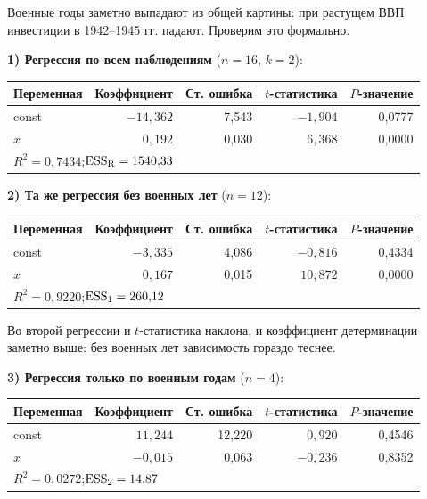 \begin{solution}
Военные годы заметно выпадают из общей картины: при растущем ВВП инвестиции в
1942--1945 гг. падают. Проверим это формально.

\medskip
\textbf{1) Регрессия по всем наблюдениям} ($n = 16$, $k = 2$):
\begin{center}
\begin{tabular}{lrrrr}
\toprule
Переменная & Коэффициент & Ст. ошибка & $t$-статистика & $P$-значение \\
\midrule
const & $-14{,}362$ & 7,543 & $-1{,}904$ & 0,0777 \\
$x$   & $\phantom{-}0{,}192$ & 0,030 & $\phantom{-}6{,}368$ & 0,0000 \\
\midrule
\multicolumn{5}{l}{$R^2 = 0{,}7434$;\quad $\mathrm{ESS}_{\mathrm{R}} = 1540{,}33$} \\
\bottomrule
\end{tabular}
\end{center}

\textbf{2) Та же регрессия без военных лет} ($n = 12$):
\begin{center}
\begin{tabular}{lrrrr}
\toprule
Переменная & Коэффициент & Ст. ошибка & $t$-статистика & $P$-значение \\
\midrule
const & $-3{,}335$ & 4,086 & $-0{,}816$ & 0,4334 \\
$x$   & $\phantom{-}0{,}167$ & 0,015 & $10{,}872$ & 0,0000 \\
\midrule
\multicolumn{5}{l}{$R^2 = 0{,}9220$;\quad $\mathrm{ESS}_1 = 260{,}12$} \\
\bottomrule
\end{tabular}
\end{center}

\noindent Во второй регрессии и $t$-статистика наклона, и коэффициент
детерминации заметно выше: без военных лет зависимость гораздо теснее.

\medskip
\textbf{3) Регрессия только по военным годам} ($n = 4$):
\begin{center}
\begin{tabular}{lrrrr}
\toprule
Переменная & Коэффициент & Ст. ошибка & $t$-статистика & $P$-значение \\
\midrule
const & $\phantom{-}11{,}244$ & 12,220 & $\phantom{-}0{,}920$ & 0,4546 \\
$x$   & $-0{,}015$ & \phantom{0}0,063 & $-0{,}236$ & 0,8352 \\
\midrule
\multicolumn{5}{l}{$R^2 = 0{,}0272$;\quad $\mathrm{ESS}_2 = 14{,}87$} \\
\bottomrule
\end{tabular}
\end{center}


\end{solution}

